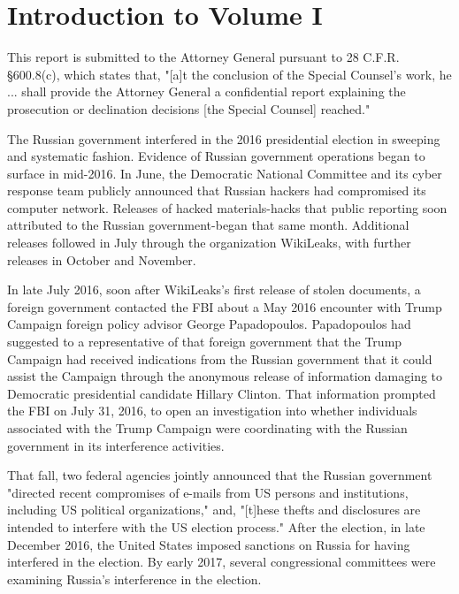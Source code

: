 \section*{Introduction to Volume I}
\label{sec:introduction}

This report is submitted to the Attorney General pursuant to 28 C.F.R. \S 600.8(c), which states that, "[a]t the conclusion of the Special Counsel's work, he ... shall provide the Attorney General a confidential report explaining the prosecution or declination decisions [the Special Counsel] reached."

The Russian government interfered in the 2016 presidential election in sweeping and systematic fashion.
Evidence of Russian government operations began to surface in mid-2016.
In June, the Democratic National Committee and its cyber response team publicly announced that Russian hackers had compromised its computer network. Releases of hacked materials-hacks that public reporting soon attributed to the Russian government-began that same month.
Additional releases followed in July through the organization WikiLeaks, with further releases in October and November.

In late July 2016, soon after WikiLeaks's first release of stolen documents, a foreign government contacted the FBI about a May 2016 encounter with Trump Campaign foreign policy advisor George Papadopoulos.
Papadopoulos had suggested to a representative of that foreign government that the Trump Campaign had received indications from the Russian government that it could assist the Campaign through the anonymous release of information damaging to Democratic presidential candidate Hillary Clinton.
That information prompted the FBI on July 31, 2016, to open an investigation into whether individuals associated with the Trump Campaign were coordinating with the Russian government in its interference activities.

That fall, two federal agencies jointly announced that the Russian government "directed recent compromises of e-mails from US persons and institutions, including US political organizations," and, "[t]hese thefts and disclosures are intended to interfere with the US election process."
After the election, in late December 2016, the United States imposed sanctions on Russia for having interfered in the election. By early 2017, several congressional committees were examining Russia's interference in the election.

